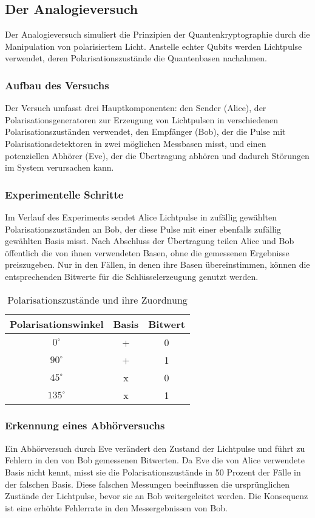 \subsection{Der Analogieversuch}
Der Analogieversuch simuliert die Prinzipien der Quantenkryptographie durch die Manipulation von polarisiertem Licht. Anstelle echter Qubits werden Lichtpulse verwendet, deren Polarisationszustände die Quantenbasen nachahmen.

\subsubsection{Aufbau des Versuchs}
Der Versuch umfasst drei Hauptkomponenten: den Sender (Alice), der Polarisationsgeneratoren zur Erzeugung von Lichtpulsen in verschiedenen Polarisationszuständen verwendet, den Empfänger (Bob), der die Pulse mit Polarisationsdetektoren in zwei möglichen Messbasen misst, und einen potenziellen Abhörer (Eve), der die Übertragung abhören und dadurch Störungen im System verursachen kann.

\subsubsection{Experimentelle Schritte}
Im Verlauf des Experiments sendet Alice Lichtpulse in zufällig gewählten Polarisationszuständen an Bob, der diese Pulse mit einer ebenfalls zufällig gewählten Basis misst. Nach Abschluss der Übertragung teilen Alice und Bob öffentlich die von ihnen verwendeten Basen, ohne die gemessenen Ergebnisse preiszugeben. Nur in den Fällen, in denen ihre Basen übereinstimmen, können die entsprechenden Bitwerte für die Schlüsselerzeugung genutzt werden. 

\begin{table}[H]
\centering
\caption{Polarisationszustände und ihre Zuordnung}
\begin{tabular}{ccc}
\toprule
\textbf{Polarisationswinkel} & \textbf{Basis} & \textbf{Bitwert} \\
\midrule
\(0^\circ\) & + & 0 \\
\(90^\circ\) & + & 1 \\
\(45^\circ\) & x & 0 \\
\(135^\circ\) & x & 1 \\
\bottomrule
\end{tabular}
\end{table}

\subsubsection{Erkennung eines Abhörversuchs}
Ein Abhörversuch durch Eve verändert den Zustand der Lichtpulse und führt zu Fehlern in den von Bob gemessenen Bitwerten. Da Eve die von Alice verwendete Basis nicht kennt, misst sie die Polarisationszustände in 50 Prozent der Fälle in der falschen Basis. Diese falschen Messungen beeinflussen die ursprünglichen Zustände der Lichtpulse, bevor sie an Bob weitergeleitet werden. Die Konsequenz ist eine erhöhte Fehlerrate in den Messergebnissen von Bob.

